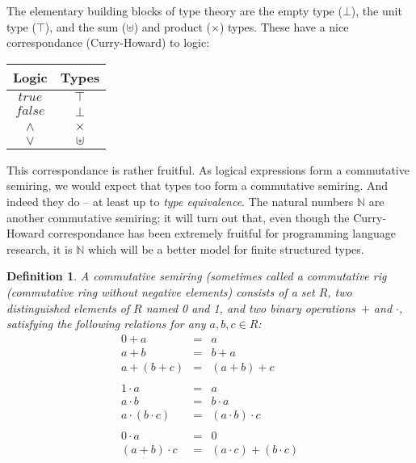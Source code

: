 \documentclass{article}
\newtheorem{defn}{Definition}[section]
\newcommand{\Nat}{\ensuremath{\mathbb{N}}}
\newcommand{\true}{\mathit{true}}
\newcommand{\false}{\mathit{false}}
\begin{document}
The elementary building blocks of type theory are the empty type
($\bot$), the unit type ($\top$), and the sum ($\uplus$) and product
($\times$) types.  These have a nice correspondance (Curry-Howard)
to logic:

\begin{center}
\begin{tabular}{c|c}
Logic & Types \\ \hline
$\true$ & $\top$ \\
$\false$ & $\bot$ \\
$\land$ & $\times$ \\
$\lor$ & $\uplus$ \\
\end{tabular}
\end{center}

This correspondance is rather fruitful. As logical expressions form
a commutative semiring, we would expect that types too form a commutative
semiring. And indeed they do -- at least up to \emph{type equivalence}.  The
natural numbers $\Nat$ are another commutative semiring; it will turn out that,
even though the Curry-Howard correspondance has been extremely fruitful for
programming language research, it is $\Nat$ which will be a better model for
finite structured types.

\begin{defn}
  A \emph{commutative semiring} (sometimes called a \emph{commutative
    rig} (commutative ri\emph{n}g without negative elements) consists of a
  set $R$, two distinguished elements of $R$ named 0 and 1, and two
  binary operations~$+$ and $\cdot$, satisfying the following
  relations for any $a,b,c \in R$:
\begin{equation}
\begin{array}{rcl}
0 + a &=& a \\
a + b &=& b + a \\
a + (b + c) &=& (a + b) + c \\
\\
1 \cdot a &=& a \\
a \cdot b &=& b \cdot a \\
a \cdot (b \cdot c) &=& (a \cdot b) \cdot c \\
\\
0 \cdot a &=& 0 \\
(a + b) \cdot c &=& (a \cdot c) + (b \cdot c)
\end{array}
\label{eq:csemiring}
\end{equation}
\end{defn}
\end{document}
